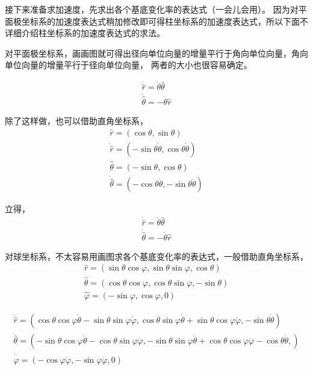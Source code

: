 \documentclass{ctexart}
\begin{document}
    接下来准备求加速度，先求出各个基底变化率的表达式（一会儿会用）。
    因为对平面极坐标系的加速度表达式稍加修改即可得柱坐标系的加速度表达式，所以下面不详细介绍柱坐标系的加速度表达式的求法。

    对平面极坐标系，画画图就可得出径向单位向量的增量平行于角向单位向量，角向单位向量的增量平行于径向单位向量，
    两者的大小也很容易确定。

    \begin{gather*}
        \dot{\hat{r}} = \dot{\theta}\hat{\theta} \\
        \dot{\hat{\theta}} = -\dot{\theta}\hat{r}
    \end{gather*}

    除了这样做，也可以借助直角坐标系，
    \begin{gather*}
        \hat{r} = (\cos\theta,\sin\theta) \\
        \dot{\hat{r}} = (-\sin\theta\dot{\theta},\cos\theta\dot{\theta}) \\
        \hat{\theta} = (-\sin\theta,\cos\theta) \\
        \dot{\hat{\theta}} = (-\cos\theta\dot{\theta},-\sin\theta\dot{\theta})
    \end{gather*}

    立得，
    \begin{gather*}
        \dot{\hat{r}} = \dot{\theta}\hat{\theta} \\
        \dot{\hat{\theta}} = -\dot{\theta}\hat{r}
    \end{gather*}

    对球坐标系，不太容易用画图求各个基底变化率的表达式，一般借助直角坐标系，
    \begin{gather*}
        \hat{r} = (\sin\theta\cos\varphi,\sin\theta\sin\varphi,\cos\theta) \\
        \hat{\theta} = (\cos\theta\cos\varphi,\cos\theta\sin\varphi,-\sin\theta) \\
        \hat{\varphi} = (-\sin\varphi,\cos\varphi,0)
    \end{gather*}

    \begin{gather*}
        \dot{\hat{r}} = (\cos\theta\cos\varphi\dot{\theta}-\sin\theta\sin\varphi\dot{\varphi},
        \cos\theta\sin\varphi\dot{\theta}+\sin\theta\cos\varphi\dot{\varphi},
        -\sin\theta\dot{\theta}) \\
        \dot{\hat{\theta}} = (-\sin\theta\cos\varphi\dot{\theta}-\cos\theta\sin\varphi\dot{\varphi},
        -\sin\theta\sin\varphi\dot{\theta}+\cos\theta\cos\varphi\dot{\varphi}
        -\cos\theta\dot{\theta},) \\
        \dot{\hat{\varphi}} = (-\cos\varphi\dot{\varphi},-\sin\varphi\dot{\varphi},0)
    \end{gather*}
\end{document}
